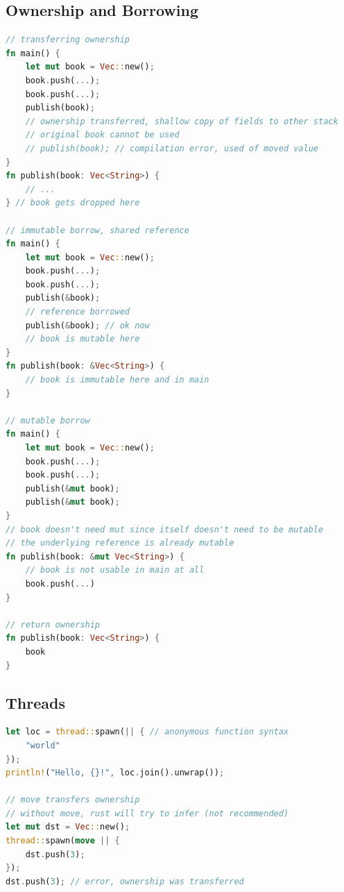 \documentclass{article}
\begin{document}
\subsection{Ownership and Borrowing}
\begin{lstlisting}[language=Rust]
// transferring ownership
fn main() {
    let mut book = Vec::new();
    book.push(...);
    book.push(...);
    publish(book);
    // ownership transferred, shallow copy of fields to other stack
    // original book cannot be used
    // publish(book); // compilation error, used of moved value
}
fn publish(book: Vec<String>) {
    // ...
} // book gets dropped here

// immutable borrow, shared reference
fn main() {
    let mut book = Vec::new();
    book.push(...);
    book.push(...);
    publish(&book);
    // reference borrowed
    publish(&book); // ok now
    // book is mutable here
}
fn publish(book: &Vec<String>) {
    // book is immutable here and in main
}

// mutable borrow
fn main() {
    let mut book = Vec::new();
    book.push(...);
    book.push(...);
    publish(&mut book);
    publish(&mut book);
}
// book doesn't need mut since itself doesn't need to be mutable
// the underlying reference is already mutable
fn publish(book: &mut Vec<String>) {
    // book is not usable in main at all
    book.push(...)
}

// return ownership
fn publish(book: Vec<String>) {
    book
}
\end{lstlisting}

\subsection{Threads}

\begin{lstlisting}[language=Rust]
let loc = thread::spawn(|| { // anonymous function syntax
    "world"
});
println!("Hello, {}!", loc.join().unwrap());

// move transfers ownership
// without move, rust will try to infer (not recommended)
let mut dst = Vec::new();
thread::spawn(move || {
    dst.push(3);
});
dst.push(3); // error, ownership was transferred
\end{lstlisting}
\end{document}
